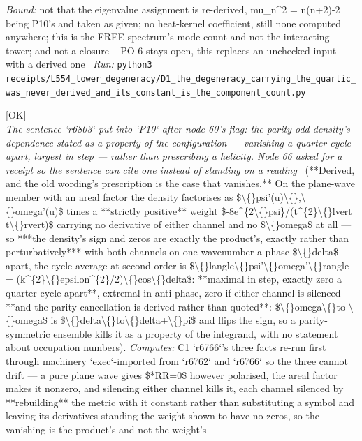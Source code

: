 \begin{description}
 \emph{Bound:} not that the eigenvalue assignment is re-derived, mu\_n\textasciicircum{}2 = n(n+2)-2 being P10's and taken as given; no heat-kernel coefficient, still none computed anywhere; this is the FREE spectrum's mode count and not the interacting tower; and not a closure -- PO-6 stays open, this replaces an unchecked input with a derived one
\ \emph{Run:} \texttt{python3 receipts/L554\_tower\_degeneracy/D1\_the\_degeneracy\_carrying\_the\_quartic\_was\_never\_derived\_and\_its\_constant\_is\_the\_component\_count.py}
\item[\rcptlabel{P10_the_parity_odd_density_goes_with_the_relative_phase_of_the_two_channels}{P10R22}\textbf{P10R22}\quad\texttt{P10\_the\_parity\_odd\_density\_goes\_with\_the\_relative\_phase\_of\_the\_two\_channels}]\hfill\textsf{[OK]}\\
\textit{The sentence `r6803` put into `P10` after node 60's flag: the parity-odd density's dependence stated as a property of the configuration --- vanishing a quarter-cycle apart, largest in step --- rather than prescribing a helicity. Node 66 asked for a receipt so the sentence can cite one instead of standing on a reading} \ (**Derived, and the old wording's prescription is the case that vanishes.** On the plane-wave member with an areal factor the density factorises as \$\textbackslash\{\}psi'(u)\textbackslash\{\},\textbackslash\{\}omega'(u)\$ times a **strictly positive** weight \$-8e\textasciicircum{}\{2\textbackslash\{\}psi\}/(t\textasciicircum{}\{2\}\textbackslash\{\}lvert t\textbackslash\{\}rvert)\$ carrying no derivative of either channel and no \$\textbackslash\{\}omega\$ at all --- so ***the density's sign and zeros are exactly the product's, exactly rather than perturbatively***  with both channels on one wavenumber a phase \$\textbackslash\{\}delta\$ apart, the cycle average at second order is \$\textbackslash\{\}langle\textbackslash\{\}psi'\textbackslash\{\}omega'\textbackslash\{\}rangle = (k\textasciicircum{}\{2\}\textbackslash\{\}epsilon\textasciicircum{}\{2\}/2)\textbackslash\{\}cos\textbackslash\{\}delta\$: **maximal in step, exactly zero a quarter-cycle apart**, extremal in anti-phase, zero if either channel is silenced  **and the parity cancellation is derived rather than quoted**: \$\textbackslash\{\}omega\textbackslash\{\}to-\textbackslash\{\}omega\$ is \$\textbackslash\{\}delta\textbackslash\{\}to\textbackslash\{\}delta+\textbackslash\{\}pi\$ and flips the sign, so a parity-symmetric ensemble kills it as a property of the integrand, with no statement about occupation numbers). 
\emph{Computes:} C1 `r6766`'s three facts re-run first through machinery `exec`-imported from `r6762` and `r6766` so the three cannot drift --- a pure plane wave gives \$*RR=0\$ however polarised, the areal factor makes it nonzero, and silencing either channel kills it, each channel silenced by **rebuilding** the metric with it constant rather than substituting a symbol and leaving its derivatives standing  the weight shown to have no zeros, so the vanishing is the product's and not the weight's

\end{description}
